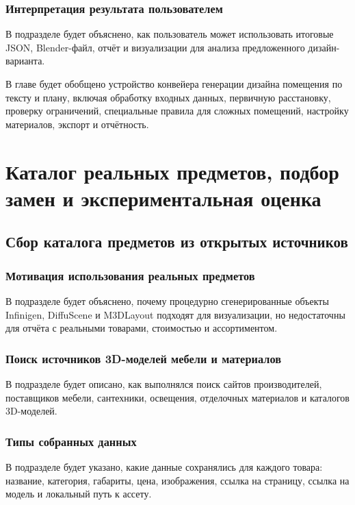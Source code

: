 \documentclass[times]{itmo-student-thesis}
\begin{document}
\subsection{Интерпретация результата пользователем}
В подразделе будет объяснено, как пользователь может использовать итоговые JSON, Blender-файл, отчёт и визуализации для анализа предложенного дизайн-варианта.

\chapterconclusion

В главе будет обобщено устройство конвейера генерации дизайна помещения по тексту и плану, включая обработку входных данных, первичную расстановку, проверку ограничений, специальные правила для сложных помещений, настройку материалов, экспорт и отчётность.

\chapter{Каталог реальных предметов, подбор замен и экспериментальная оценка}

\section{Сбор каталога предметов из открытых источников}

\subsection{Мотивация использования реальных предметов}
В подразделе будет объяснено, почему процедурно сгенерированные объекты Infinigen, DiffuScene и M3DLayout подходят для визуализации, но недостаточны для отчёта с реальными товарами, стоимостью и ассортиментом.

\subsection{Поиск источников 3D-моделей мебели и материалов}
В подразделе будет описано, как выполнялся поиск сайтов производителей, поставщиков мебели, сантехники, освещения, отделочных материалов и каталогов 3D-моделей.

\subsection{Типы собранных данных}
В подразделе будет указано, какие данные сохранялись для каждого товара: название, категория, габариты, цена, изображения, ссылка на страницу, ссылка на модель и локальный путь к ассету.
\end{document}
